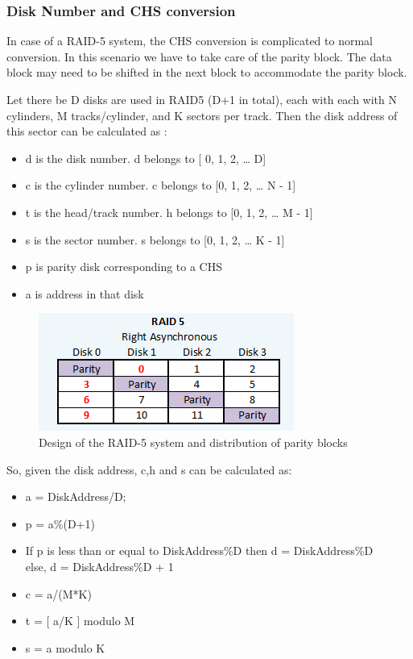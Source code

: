 \documentclass[11pt]{article}
\begin{document}
\subsubsection{Disk Number and CHS conversion}
In case of a RAID-5 system, the CHS conversion is complicated to normal conversion. In this scenario we have to take care of the parity block. The data block may need to be shifted in the next block to accommodate the parity block.


Let there be D disks are used in RAID5 (D+1 in total), each with each with N cylinders, M tracks/cylinder, and K sectors per track. Then the disk address of this sector can be calculated as :
\\
\begin{itemize}
\item d is the disk number. d  belongs to [ 0, 1, 2, …  D] 
\item c is the cylinder number. c belongs to [0, 1, 2, … N - 1] 
\item t is the head/track number. h belongs to [0, 1, 2, … M - 1] 
\item s is the sector number. s belongs to  [0, 1, 2, … K - 1] 
\item p is parity disk corresponding to a CHS 
\item a is address in that disk \\
\end{itemize}

\begin{figure}[ht!]
\center
\includegraphics[scale = 1.40]{images/raid5.png}
\caption{Design of the RAID-5 system and distribution of parity blocks}
\label{overflow}
\end{figure}

So, given the disk address, c,h and s can be calculated  as:
\begin{itemize}
\item a = DiskAddress/D;

\item p = a\%(D+1) 

\item {If p is less than or equal to DiskAddress\%D then d = DiskAddress\%D  \\
	else, d = DiskAddress\%D + 1}
\item c = a/(M*K)
\item t = [ a/K ] modulo M
\item s = a modulo K
\end{itemize}
\end{document}
